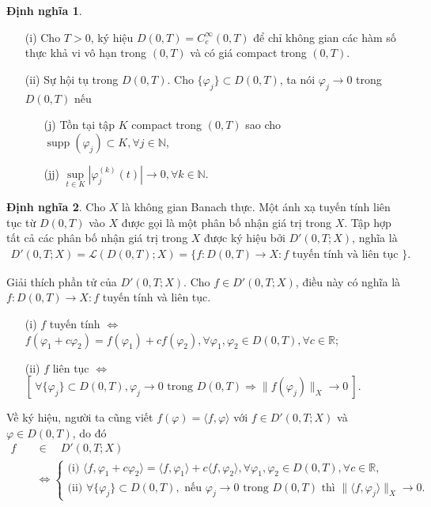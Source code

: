 \documentclass[12pt,a4paper]{article}
\DeclareMathOperator{\supp}{supp}
\theoremstyle{definition}
\newtheorem{definition}{Định nghĩa}[section]
\theoremstyle{definition}
\begin{document}
\begin{definition}\end{definition}
\begin{enumerate}
    \item[(i)] Cho $T > 0$, ký hiệu $D(0,T) = C_c^\infty(0,T)$ để chỉ không gian các hàm số thực khả vi vô hạn trong $(0,T)$ và có giá compact trong $(0,T)$.
    \item[(ii)] Sự hội tụ trong $D(0,T)$. Cho $\{\varphi_j\} \subset D(0,T)$, ta nói $\varphi_j \to 0$ trong $D(0,T)$ nếu
    \begin{enumerate}
        \item[(j)] Tồn tại tập $K$ compact trong $(0,T)$ sao cho $\supp(\varphi_j) \subset K, \forall j \in \mathbb{N}$,
        \item[(jj)] $\underset{t \in K}{\sup} \left|\varphi_j^{(k)} (t)\right| \to 0, \forall k \in \mathbb{N}$.
    \end{enumerate}
\end{enumerate}

\begin{definition}
Cho $X$ là không gian Banach thực. Một ánh xạ tuyến tính liên tục từ $D(0,T)$ vào $X$ được gọi là một phân bố nhận giá trị trong $X$. Tập hợp tất cả các phân bố nhận giá trị trong $X$ được ký hiệu bởi $D'(0,T;X)$, nghĩa là
\begin{align*}
    D'(0,T;X) = \mathcal{L}(D(0,T);X) = \{ f: D(0,T) \to X : f \text{ tuyến tính và liên tục } \}.
\end{align*}
\end{definition}

Giải thích phần tử của $D'(0,T;X)$. Cho $f \in D'(0,T;X)$, điều này có nghĩa là $f:D(0,T) \to X : f$ tuyến tính và liên tục.
\begin{enumerate}
    \item[(i)] $f$ tuyến tính $\Longleftrightarrow$ $f(\varphi_1 + c\varphi_2) = f(\varphi_1) + cf(\varphi_2), \forall \varphi_1, \varphi_2 \in D(0,T), \forall c \in \mathbb{R}$;
    \item[(ii)] $f$ liên tục $\Longleftrightarrow$ $\left[\:\forall\{\varphi_j\} \subset D(0,T), \varphi_j \to 0 \text{ trong } D(0,T) \Longrightarrow \|f(\varphi_j)\|_X \to 0\:\right]$.
\end{enumerate}

Về ký hiệu, người ta cũng viết $f(\varphi) = \langle f, \varphi \rangle$ với $f \in D'(0,T;X)$ và $\varphi \in D(0,T)$, do đó
\begin{align*}
    f \quad &\in \quad D'(0,T;X) \\
    &\Longleftrightarrow \begin{cases}
        \text{(i) } \langle f, \varphi_1 + c\varphi_2 \rangle = \langle f, \varphi_1 \rangle + c \langle f, \varphi_2 \rangle, \forall \varphi_1, \varphi_2 \in D(0,T), \forall c \in \mathbb{R}, \\
        \text{(ii) } \forall\{\varphi_j\} \subset D(0,T), \text{ nếu } \varphi_j \to 0 \text{ trong } D(0,T) \text{ thì } \|\langle f, \varphi_j\rangle\|_X \to 0.
    \end{cases}
\end{align*}
\end{document}
